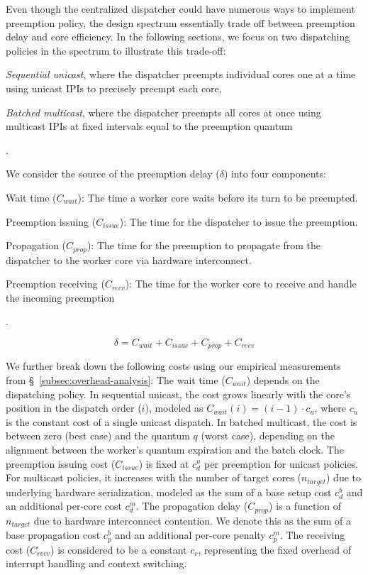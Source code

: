 Even though the centralized dispatcher could have numerous ways to implement preemption policy, the design spectrum essentially trade off between preemption delay and core efficiency.
In the following sections, we focus on two dispatching policies in the spectrum to illustrate this trade-off:
\begin{enumerate*}[label=(\roman*)]
  \item \textit{Sequential unicast}, where the dispatcher preempts individual cores one at a time using unicast IPIs to precisely preempt each core,
  \item \textit{Batched multicast}, where the dispatcher preempts all cores at once using multicast IPIs at fixed intervals equal to the preemption quantum
\end{enumerate*}.

We consider the source of the preemption delay ($\delta$) into four components:
\begin{enumerate*}
    \item Wait time ($C_{wait}$): The time a worker core waits before its turn to be preempted.
    \item Preemption issuing ($C_{issue}$): The time for the dispatcher to issue the preemption.
    \item Propagation ($C_{prop}$): The time for the preemption to propagate from the dispatcher to the worker core via hardware interconnect.
    \item Preemption receiving ($C_{recv}$): The time for the worker core to receive and handle the incoming preemption
\end{enumerate*}.

\begin{equation}
\delta = C_{wait} + C_{issue} + C_{prop} + C_{recv}
\label{drift-eq}
\end{equation}

We further break down the following costs using our empirical measurements from \S~\ref{subsec:overhead-analysis}:
The wait time ($C_{wait}$) depends on the dispatching policy.
In sequential unicast, the cost grows linearly with the core's position in the dispatch order ($i$), modeled as $C_{wait} (i) = (i-1) \cdot c_{u}$, where $c_{u}$ is the constant cost of a single unicast dispatch.
In batched multicast, the cost is between zero (best case) and the quantum $q$ (worst case), depending on the alignment between the worker's quantum expiration and the batch clock.
The preemption issuing cost ($C_{issue}$) is fixed at $c_{d}^{u}$ per preemption for unicast policies. 
For multicast policies, it increases with the number of target cores ($n_{target}$) due to underlying hardware serialization, modeled as the sum of a base setup cost $c_{d}^{b}$ and an additional per-core cost $c_{d}^{m}$.
The propagation delay ($C_{prop}$) is a function of $n_{target}$ due to hardware interconnect contention. We denote this as the sum of a base propagation cost $c_{p}^{b}$ and an additional per-core penalty $c_{p}^{m}$. 
The receiving cost ($C_{recv}$) is considered to be a constant $c_{r}$, representing the fixed overhead of interrupt handling and context switching.

